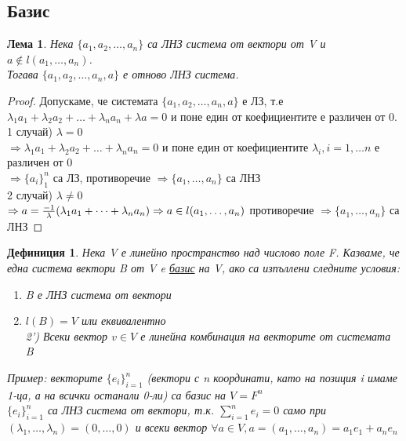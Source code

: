 \documentclass[fleqn,12pt]{article}
\newtheorem*{Lem}{Лема}
\newtheorem*{Def}{Дефиниция}
\begin{document}
\begin{justify}
\subsection{Базис}
\begin{Lem}
    Нека $\{a_1, a_2, \dots, a_n\}$ са ЛНЗ система от вектори от V и $a\notin l(a_1, \dots, a_n)$.\\
    Тогава $\{a_1,a_2, \dots, a_n,a\}$ е отново ЛНЗ система.
\end{Lem}
\begin{proof}
    Допускаме, че системата $\{a_1, a_2, \dots, a_n, a\}$ е ЛЗ, т.е\\
    $\lambda_1a_1 + \lambda_2a_2 + \dots + \lambda_n a_n + \lambda a = 0$ и поне един от коефициентите
    е различен от 0.\\
    1 случай) $\lambda=0$\\
    $\Rightarrow \lambda_1a_1 + \lambda_2a_2 + \dots + \lambda_n a_n = 0$ и поне един от коефициентите
    $\lambda_i, i = 1, \dots n$ е различен от 0\\
    $\Rightarrow \{a_i\}_1^n$ са ЛЗ, противоречие $\Rightarrow \{a_1,\dots,a_n\}$ са ЛНЗ\\
    2 случай) $\lambda \neq 0$\\
    $\Rightarrow a = \frac{-1}{\lambda}(\lambda_1 a_1 + \dots + \lambda_n a_n) \\
    \Rightarrow a \in l(a_1,\dots,a_n)$ противоречие $\Rightarrow \{a_1,\dots,a_n\}$ са ЛНЗ
\end{proof}
\begin{Def}
    Нека V е линейно пространство над числово поле F. Казваме, че една система вектори B от V e
    \underline{базис} на V, ако са изпъллени следните условия:
    \begin{enumerate}
        \item  B е ЛНЗ система от вектори
        \item $l(B) = V$ или еквивалентно \\
        2') Всеки вектор $v \in V$ е линейна комбинация на векторите от
        системата B
    \end{enumerate}
    Пример: векторите $\{e_i\}_{i=1}^n$ (вектори с n координати, като на позиция i имаме 1-ца, а на
    всички останали 0-ли) са базис на $V = F^n$\\
    $\{e_i\}_{i=1}^n$ са ЛНЗ система от вектори, т.к. $\sum_{i=1}^{n} e_i = 0$ само при
    $(\lambda_1,\dots,\lambda_n) = (0,\dots,0)$ и всеки вектор $\forall a \in V, a=(a_1,\dots,a_n)=a_1 e_1
    + a_n e_n$
\end{Def}

\end{justify}
\end{document}
